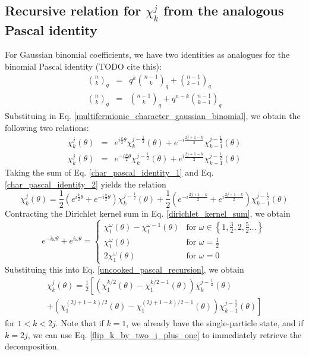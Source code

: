 \documentclass[12pt]{article}
\begin{document}
	\subsection{Recursive relation for $\chi^j_k$ from the analogous Pascal identity}
	For Gaussian binomial coefficients, we have two identities as analogues for the binomial Pascal identity (TODO cite this):
	\begin{eqnarray}
	{n\choose k}_q &=& q^k {{n-1}\choose k}_q + {{n-1}\choose {k-1}}_q \label{pascal_identity_1}\\
	{n\choose k}_q &=& {{n-1}\choose k}_q + q^{n-k} {{n-1}\choose {k-1}}_q \label{pascal_identity_2}
	\end{eqnarray}
	Substituing in Eq. \ref{multifermionic_character_gaussian_binomial}, we obtain the following two relations:
	\begin{eqnarray}
	\chi^j_k(\theta) &=& e^{i\frac{k}{2}\theta} \chi^{j-\frac{1}{2}}_k(\theta) + e^{-i\frac{2j+1-k}{2}} \chi^{j-\frac{1}{2}}_{k-1}(\theta)\label{char_pascal_identity_1}\\
	\chi^j_k(\theta) &=& e^{-i\frac{k}{2}\theta} \chi^{j-\frac{1}{2}}_k(\theta) + e^{i\frac{2j+1-k}{2}} \chi^{j-\frac{1}{2}}_{k-1}(\theta) \label{char_pascal_identity_2}
	\end{eqnarray}
	Taking the sum of Eq. \ref{char_pascal_identity_1} and Eq. \ref{char_pascal_identity_2} yields the relation
	\begin{equation} \label{uncooked_pascal_recursion}
	\chi^j_k(\theta) = \frac{1}{2}\left(e^{i\frac{k}{2}\theta}+e^{-i\frac{k}{2}\theta}\right)\chi^{j-\frac{1}{2}}_k(\theta) + \frac{1}{2}\left(e^{-i\frac{2j+1-k}{2}} + e^{i\frac{2j+1-k}{2}}\right) \chi^{j-\frac{1}{2}}_{k-1}(\theta)
	\end{equation}
	Contracting the Dirichlet kernel sum in Eq. \ref{dirichlet_kernel_sum}, we obtain
	\begin{equation} \label{q_plus_q_inverse}
	e^{-i\omega\theta}+e^{i\omega\theta} = \begin{cases}
	\chi^\omega_1(\theta)-\chi^{\omega-1}_1(\theta) & \text{for } \omega \in \left\{1, \frac{3}{2}, 2, \frac{5}{2}\dots\right\}\\
	\chi^\omega_1(\theta) & \text{for } \omega = \frac{1}{2}\\
	2\chi^\omega_1(\theta) & \text{for } \omega = 0
	\end{cases}
	\end{equation}
	Substituing this into Eq. \ref{uncooked_pascal_recursion}, we obtain
	\begin{multline}  \label{pascal_recursion}
	\chi^j_k(\theta) = \frac{1}{2}\left[\left(\chi^{k/2}_1(\theta)-\chi^{k/2-1}_1(\theta)\right)\chi^{j-\frac{1}{2}}_k(\theta)\right.\\
	 \left.+ \left(\chi^{(2j+1-k)/2}_1(\theta)-\chi^{(2j+1-k)/2-1}_1(\theta)\right) \chi^{j-\frac{1}{2}}_{k-1}(\theta)\right]
	\end{multline}
	for $1<k<2j$. Note that if $k=1$, we already have the single-particle state, and if $k=2j$, we can use Eq. \ref{flip_k_by_two_j_plus_one} to immediately retrieve the decomposition.
	
\end{document}
